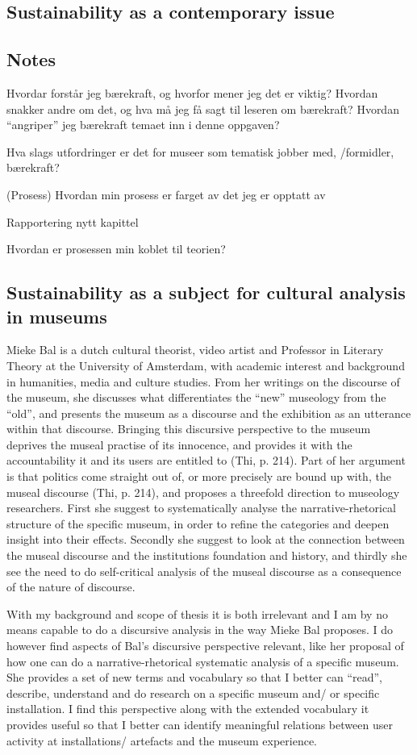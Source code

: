 \subsection{Sustainability as a contemporary issue}



 
\subsection{Notes}
Hvordar forstår jeg bærekraft, og hvorfor mener jeg det er viktig?
Hvordan snakker andre om det, og hva må jeg få sagt til leseren om bærekraft?
Hvordan “angriper” jeg bærekraft temaet inn i denne oppgaven?

Hva slags utfordringer er det for museer som tematisk jobber med, /formidler, bærekraft?

(Prosess) Hvordan min prosess er farget av det jeg er opptatt av

Rapportering nytt kapittel

Hvordan er prosessen min koblet til teorien?



\subsection{Sustainability as a subject for cultural analysis in museums}
Mieke Bal is a dutch cultural theorist, video artist and Professor in Literary Theory at the University of Amsterdam, with academic interest and background in humanities, media and culture studies. From her writings on the discourse of the museum, she discusses what differentiates the “new” museology from the “old”, and presents the museum as a discourse and the exhibition as an utterance within that discourse. Bringing this discursive perspective to the museum deprives the museal practise of its innocence, and provides it with the accountability it and its users are entitled to (Thi, p. 214). Part of her argument is that politics come straight out of, or more precisely are bound up with, the museal discourse (Thi, p. 214), and proposes a threefold direction to museology researchers. First she suggest to systematically analyse the narrative-rhetorical structure of the specific museum, in order to refine the categories and deepen insight into their effects. Secondly she suggest to look at the connection between the museal discourse and the institutions foundation and history, and thirdly she see the need to do self-critical analysis of the museal discourse as a consequence of the nature of discourse.

With my background and scope of thesis it is both irrelevant and I am by no means capable to do a discursive analysis in the way Mieke Bal proposes. I do however find aspects of Bal’s discursive perspective relevant, like her proposal of how one can do a narrative-rhetorical systematic analysis of a specific museum. She provides a set of new terms and vocabulary so that I better can “read”, describe, understand and do research on a specific museum and/ or specific installation. I find this perspective along with the extended vocabulary it provides useful so that I better can identify meaningful relations between user activity at installations/ artefacts and the museum experience.
